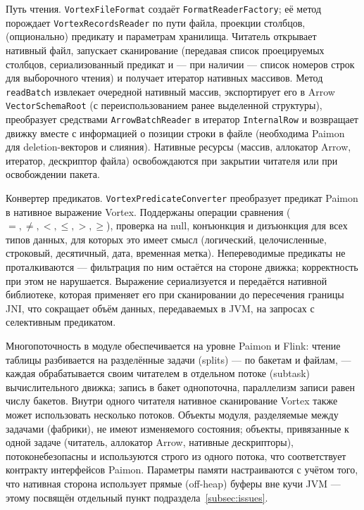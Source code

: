 Путь чтения. \texttt{VortexFileFormat} создаёт \texttt{FormatReaderFactory};
её метод порождает \texttt{VortexRecordsReader} по пути файла, проекции столбцов,
(опционально) предикату и параметрам хранилища. Читатель открывает нативный файл,
запускает сканирование (передавая список проецируемых столбцов, сериализованный
предикат и --- при наличии --- список номеров строк для выборочного чтения) и
получает итератор нативных массивов. Метод \texttt{readBatch} извлекает очередной
нативный массив, экспортирует его в Arrow \texttt{VectorSchemaRoot} (с
переиспользованием ранее выделенной структуры), преобразует средствами
\texttt{ArrowBatchReader} в итератор \texttt{InternalRow} и возвращает движку
вместе с информацией о позиции строки в файле (необходима Paimon для
deletion-векторов и слияния). Нативные ресурсы (массив, аллокатор Arrow, итератор,
дескриптор файла) освобождаются при закрытии читателя или при освобождении пакета.

Конвертер предикатов. \texttt{VortexPredicateConverter} преобразует
предикат Paimon в нативное выражение Vortex. Поддержаны операции сравнения
(\(=, \ne, <, \le, >, \ge\)), проверка на null, конъюнкция и дизъюнкция для всех
типов данных, для которых это имеет смысл (логический, целочисленные, строковый,
десятичный, дата, временная метка). Непереводимые предикаты не проталкиваются ---
фильтрация по ним остаётся на стороне движка; корректность при этом не нарушается.
Выражение сериализуется и передаётся нативной библиотеке, которая применяет его при
сканировании до пересечения границы JNI, что сокращает объём данных, передаваемых в
JVM, на запросах с селективным предикатом.

Многопоточность в модуле обеспечивается на уровне Paimon и Flink: чтение
таблицы разбивается на разделённые задачи (splits) --- по бакетам и файлам, ---
каждая обрабатывается своим читателем в отдельном потоке (subtask) вычислительного
движка; запись в бакет однопоточна, параллелизм записи равен числу бакетов. Внутри
одного читателя нативное сканирование Vortex также может использовать несколько
потоков. Объекты модуля, разделяемые между задачами (фабрики), не имеют изменяемого
состояния; объекты, привязанные к одной задаче (читатель, аллокатор Arrow,
нативные дескрипторы), потоконебезопасны и используются строго из одного потока, что
соответствует контракту интерфейсов Paimon. Параметры памяти настраиваются с учётом
того, что нативная сторона использует прямые (off-heap) буферы вне кучи JVM ---
этому посвящён отдельный пункт подраздела~\ref{subsec:issues}.

